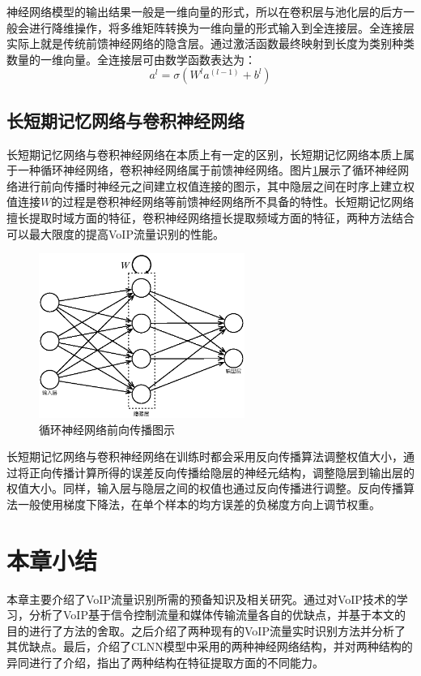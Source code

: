 神经网络模型的输出结果一般是一维向量的形式，所以在卷积层与池化层的后方一般会进行降维操作，将多维矩阵转换为一维向量的形式输入到全连接层。全连接层实际上就是传统前馈神经网络的隐含层。通过激活函数最终映射到长度为类别种类数量的一维向量。全连接层可由数学函数表达为：
\begin{equation}
 a^l= \sigma( W^l a^(l-1)  + b^l)
\end{equation}

\subsection{长短期记忆网络与卷积神经网络}
长短期记忆网络与卷积神经网络在本质上有一定的区别，长短期记忆网络本质上属于一种循环神经网络，卷积神经网络属于前馈神经网络。图片\ref{fig:rnn}展示了循环神经网络进行前向传播时神经元之间建立权值连接的图示，其中隐层之间在时序上建立权值连接$W$的过程是卷积神经网络等前馈神经网络所不具备的特性。长短期记忆网络擅长提取时域方面的特征，卷积神经网络擅长提取频域方面的特征，两种方法结合可以最大限度的提高VoIP流量识别的性能。

\begin{figure}[thb]
\begin{center}
\includegraphics[width=0.6\textwidth]{figures/rnn.eps}
\caption{循环神经网络前向传播图示}\label{fig:rnn}
\end{center}
\end{figure}

长短期记忆网络与卷积神经网络在训练时都会采用反向传播算法调整权值大小，通过将正向传播计算所得的误差反向传播给隐层的神经元结构，调整隐层到输出层的权值大小。同样，输入层与隐层之间的权值也通过反向传播进行调整。反向传播算法一般使用梯度下降法，在单个样本的均方误差的负梯度方向上调节权重。

\section{本章小结}
本章主要介绍了VoIP流量识别所需的预备知识及相关研究。通过对VoIP技术的学习，分析了VoIP基于信令控制流量和媒体传输流量各自的优缺点，并基于本文的目的进行了方法的舍取。之后介绍了两种现有的VoIP流量实时识别方法并分析了其优缺点。最后，介绍了CLNN模型中采用的两种神经网络结构，并对两种结构的异同进行了介绍，指出了两种结构在特征提取方面的不同能力。






